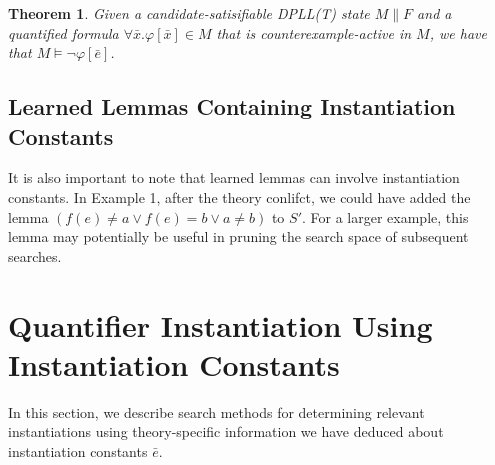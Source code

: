 \documentclass{llncs}
\newtheorem{thm}{Theorem}
\begin{document}
\begin{thm}
\label{thm:cerep}
Given a candidate-satisifiable DPLL(T) state $M \parallel F$ and a quantified formula $\forall \bar{x}. \varphi[ \bar{x} ] \in M$ that is counterexample-active in $M$, we have that $M \models \neg \varphi[\bar{e}]$.
\end{thm}

\subsection{Learned Lemmas Containing Instantiation Constants}

It is also important to note that learned lemmas can involve instantiation constants.
In Example 1, after the theory conlifct, we could have added the lemma $( f( e ) \neq a \vee f( e ) = b \vee a \neq b )$ to $S'$.
For a larger example, this lemma may potentially be useful in pruning the search space of subsequent searches.

\begin{comment}
It is also important to note that learned lemmas can involve instantiation constants.
In this example, after the theory conlifct, we could have added the lemma $(\varphi_1 : ) ( f( e ) \neq a \vee f( e ) = b \vee a \neq b )$ to $S'$.
In this case, we may apply Decide to come to the state $( a = b ), \psi, (\bot^{\neg \psi}), (f( e ) \neq a)^d \parallel S' \cup \varphi$, where again all clauses are satisfied, and the solver answers SAT in the same manner.

However, note that the lemma $\varphi_1$ is only useful in contexts in which $\psi$ is asserted.
In other words, the solver should not be searching for values of counterexamples to quantified formulas $\psi$ when $\psi$ is not asserted.
We will see in Section~\ref{sec:implementation} a recommended implementation for which this concern is addressed.
[do this: do these lemmas pollute the DPLL(T) space?  When should we forget them?  Should we give them to minisat?]
[do this: examine elaborating lemmas involving instantiation constants as being lemmas involving universal statements, justify as well]
\end{comment}

\section{Quantifier Instantiation Using Instantiation Constants}

In this section, we describe search methods for determining relevant instantiations using theory-specific information we have deduced about instantiation constants $\bar{e}$.
\end{document}
